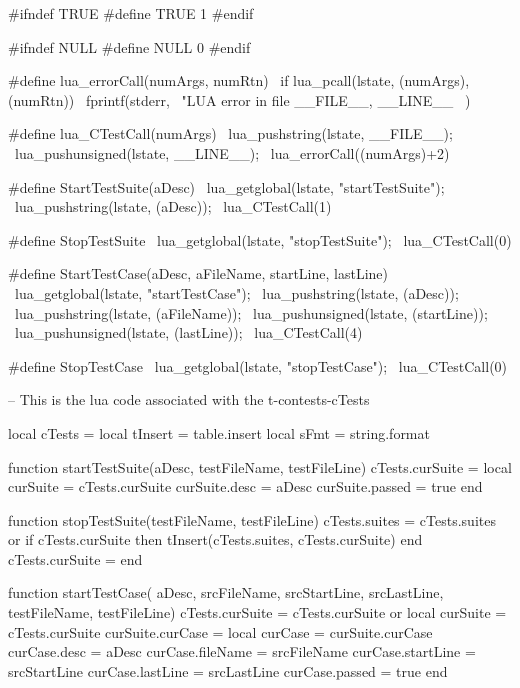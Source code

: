 #ifndef TRUE
#define TRUE 1
#endif

#ifndef NULL
#define NULL 0
#endif

#define lua_errorCall(numArgs, numRtn)        \
  if lua_pcall(lstate, (numArgs), (numRtn)) { \
    fprintf(stderr,                           \
      "LUA error in file %
      __FILE__, __LINE__                      \
    )                                         \
  }
  
#define lua_CTestCall(numArgs)        \
  lua_pushstring(lstate, __FILE__);   \
  lua_pushunsigned(lstate, __LINE__); \
  lua_errorCall((numArgs)+2)

#define StartTestSuite(aDesc)              \
  lua_getglobal(lstate, "startTestSuite"); \
  lua_pushstring(lstate, (aDesc));         \
  lua_CTestCall(1)

#define StopTestSuite                     \
  lua_getglobal(lstate, "stopTestSuite"); \
  lua_CTestCall(0)

#define StartTestCase(aDesc, aFileName, startLine, lastLine) \
  lua_getglobal(lstate, "startTestCase");                    \
  lua_pushstring(lstate, (aDesc));                           \
  lua_pushstring(lstate, (aFileName));                       \
  lua_pushunsigned(lstate, (startLine));                     \
  lua_pushunsigned(lstate, (lastLine));                      \
  lua_CTestCall(4)

#define StopTestCase                     \
  lua_getglobal(lstate, "stopTestCase"); \
  lua_CTestCall(0)

\stopCHeader

\setLuaCodeStream{cTests}
\startLuaCode
-- This is the lua code associated with the t-contests-cTests

local cTests  = { }
local tInsert = table.insert
local sFmt    = string.format

function startTestSuite(aDesc, testFileName, testFileLine)
  cTests.curSuite = { }
  local curSuite  = cTests.curSuite
  curSuite.desc   = aDesc
  curSuite.passed = true
end

function stopTestSuite(testFileName, testFileLine)
  cTests.suites = cTests.suites or { }
  if cTests.curSuite then
    tInsert(cTests.suites, cTests.curSuite)
  end
  cTests.curSuite = { }
end

function startTestCase(
  aDesc, srcFileName, srcStartLine, srcLastLine,
  testFileName, testFileLine)
  cTests.curSuite   = cTests.curSuite or { }
  local curSuite    = cTests.curSuite
  curSuite.curCase  = { }
  local curCase     = curSuite.curCase
  curCase.desc      = aDesc
  curCase.fileName  = srcFileName
  curCase.startLine = srcStartLine
  curCase.lastLine  = srcLastLine
  curCase.passed    = true
end

